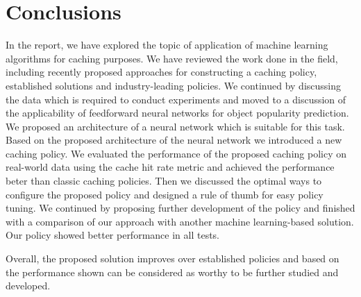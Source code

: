 \section{Conclusions}

In the report, we have explored the topic of application of machine learning algorithms for caching purposes. We have reviewed the work done in the field, including recently proposed approaches for constructing a caching policy, established solutions and industry-leading policies. We continued by discussing the data which is required to conduct experiments and moved to a discussion of the applicability of feedforward neural networks for object popularity prediction. We proposed an architecture of a neural network which is suitable for this task. Based on the proposed architecture of the neural network we introduced a new caching policy. We evaluated the performance of the proposed caching policy on real-world data using the cache hit rate metric and achieved the performance beter than classic caching policies.  Then we discussed the optimal ways to configure the proposed policy and designed a rule of thumb for easy policy tuning. We continued by proposing further development of the policy and finished with a comparison of our approach with another machine learning-based solution. Our policy showed better performance in all tests.

Overall, the proposed solution improves over established policies and based on the performance shown can be considered as worthy to be further studied and developed.